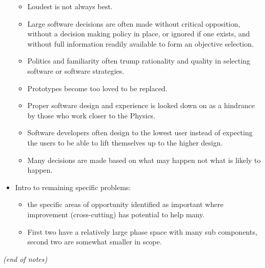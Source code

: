 \begin{itemize}
\begin{itemize}
\item Loudest is not always best.
\item Large software decisions are often made without critical opposition, without a decision making policy in place, or ignored if one exists, and without full information readily available to form an objective selection.
\item Politics and familiarity often trump rationality and quality in selecting software or software strategies.
\item Prototypes become too loved to be replaced.
\item Proper software design and experience is looked down on as a hindrance by those who work closer to the Physics.
\item Software developers often design to the lowest user instead of expecting the users to be able to lift themselves up to the higher design.
\item Many decisions are made based on what may happen not what is likely to happen.
  \end{itemize}

\item Intro to remaining specific problems:
\begin{itemize}
\item the specific areas of opportunity identified as important where improvement (cross-cutting) has potential to help many.
\item First two have a relatively large phase space with many sub components, second two are somewhat smaller in scope.
\end{itemize}

\end{itemize}
\textit{(end of notes)  }
